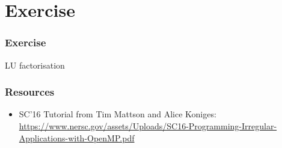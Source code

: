 \documentclass{beamer}
\begin{document}
\section{Exercise}
\begin{frame}
\frametitle{Exercise}
LU factorisation
\end{frame}

\begin{frame}
\frametitle{Resources}
\begin{itemize}
  \item SC'16 Tutorial from Tim Mattson and Alice Koniges: \url{https://www.nersc.gov/assets/Uploads/SC16-Programming-Irregular-Applications-with-OpenMP.pdf}
\end{itemize}
\end{frame}
\end{document}
